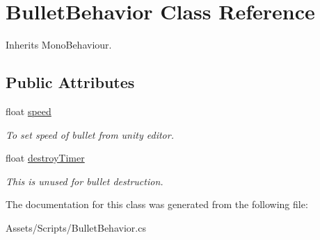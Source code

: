 \hypertarget{class_bullet_behavior}{}\section{Bullet\+Behavior Class Reference}
\label{class_bullet_behavior}


Inherits Mono\+Behaviour.

\subsection*{Public Attributes}
\begin{DoxyCompactItemize}
\item 
\mbox{\label{class_bullet_behavior_a96bc765df5aeef30e70dc9f37f262085}} 
float \mbox{\hyperlink{class_bullet_behavior_a96bc765df5aeef30e70dc9f37f262085}{speed}}
\begin{DoxyCompactList}\small\item\em To set speed of bullet from unity editor. \end{DoxyCompactList}\item 
\mbox{\label{class_bullet_behavior_adb2cef52a17afe7fa373d944e87a15d3}} 
float \mbox{\hyperlink{class_bullet_behavior_adb2cef52a17afe7fa373d944e87a15d3}{destroy\+Timer}}
\begin{DoxyCompactList}\small\item\em This is unused for bullet destruction. \end{DoxyCompactList}\end{DoxyCompactItemize}


The documentation for this class was generated from the following file\+:\begin{DoxyCompactItemize}
\item 
Assets/\+Scripts/Bullet\+Behavior.\+cs\end{DoxyCompactItemize}
